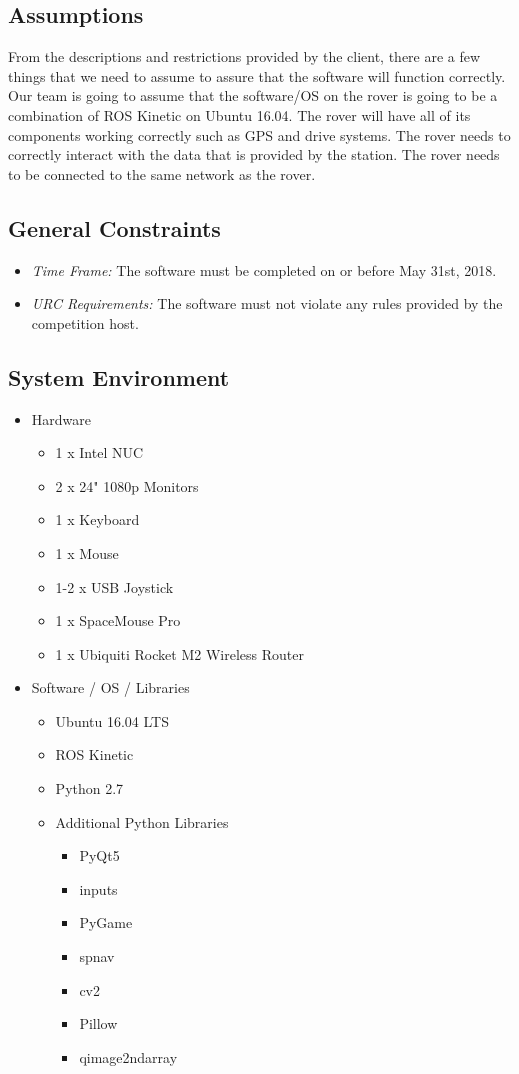 \subsection{Assumptions}
From the descriptions and restrictions provided by the client, there are a few things that we need to assume to assure that the software will function correctly. 
Our team is going to assume that the software/OS on the rover is going to be a combination of ROS Kinetic on Ubuntu 16.04. 
The rover will have all of its components working correctly such as GPS and drive systems.
The rover needs to correctly interact with the data that is provided by the station. 
The rover needs to be connected to the same network as the rover.


\subsection{General Constraints}
\begin{itemize}
\item \textit{Time Frame:} The software must be completed on or before May 31st, 2018.
\item \textit{URC Requirements:} The software must not violate any rules provided by the competition host. \cite{urc_competition_rules}
\end{itemize}


\subsection{System Environment}
\begin{itemize}
\item Hardware
  \begin{itemize}
  \item 1 x Intel NUC
  \item 2 x 24" 1080p Monitors
  \item 1 x Keyboard
  \item 1 x Mouse
  \item 1-2 x USB Joystick
  \item 1 x SpaceMouse Pro
  \item 1 x Ubiquiti Rocket M2 Wireless Router
  \end{itemize}
\item Software / OS / Libraries
  \begin{itemize}
  \item Ubuntu 16.04 LTS
  \item ROS Kinetic
  \item Python 2.7
  \item Additional Python Libraries
    \begin{itemize}
    \item PyQt5
    \item inputs
    \item PyGame
    \item spnav
    \item cv2
    \item Pillow
    \item qimage2ndarray
    \end{itemize}
  \end{itemize}
\end{itemize}


